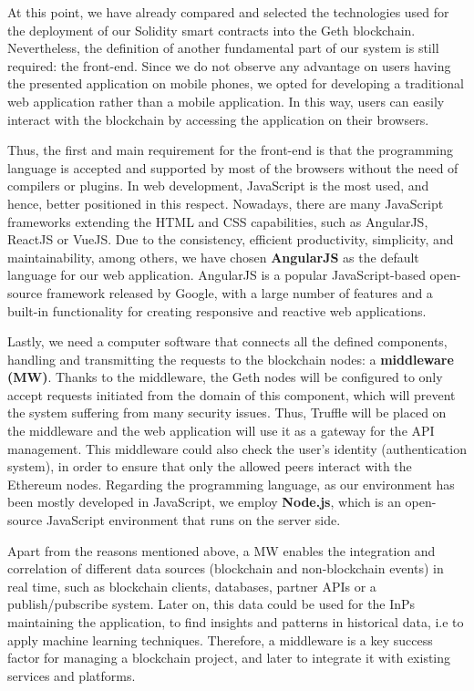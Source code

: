 At this point, we have already compared and selected the technologies used for the deployment of our Solidity smart contracts into the Geth blockchain. Nevertheless, the definition of another fundamental part of our system is still required: the front-end. Since we do not observe any advantage on users having the presented application on mobile phones, we opted for developing a traditional web application rather than a mobile application. In this way, users can easily interact with the blockchain by accessing the application on their browsers. 

Thus, the first and main requirement for the front-end is that the programming language is accepted and supported by most of the browsers without the need of compilers or plugins. In web development, JavaScript is the most used, and hence, better positioned in this respect. Nowadays, there are many JavaScript frameworks extending the HTML and CSS capabilities, such as AngularJS, ReactJS or VueJS. Due to the consistency, efficient productivity, simplicity, and maintainability, among others, we have chosen \textbf{AngularJS} as the default language for our web application. AngularJS is a popular JavaScript-based open-source framework released by Google, with a large number of features and a built-in functionality for creating responsive and reactive web applications.

Lastly, we need a computer software that connects all the defined components, handling and transmitting the requests to the blockchain nodes: a \textbf{middleware (MW)}. Thanks to the middleware, the Geth nodes will be configured to only accept requests initiated from the domain of this component, which will prevent the system suffering from many security issues. Thus, Truffle will be placed on the middleware and the web application will use it as a gateway for the API management. This middleware could also check the user's identity (authentication system), in order to ensure that only the allowed peers interact with the Ethereum nodes. Regarding the programming language, as our environment has been mostly developed in JavaScript, we employ \textbf{Node.js}, which is an open-source JavaScript environment that runs on the server side.

Apart from the reasons mentioned above, a MW enables the integration and correlation of different data sources (blockchain and non-blockchain events) in real time, such as blockchain clients, databases, partner APIs or a publish/pubscribe system. Later on, this data could be used for the InPs maintaining the application, to find insights and patterns in historical data, i.e to apply machine learning techniques. Therefore, a middleware is a key success factor for managing a blockchain project, and later to integrate it with existing services and platforms.

